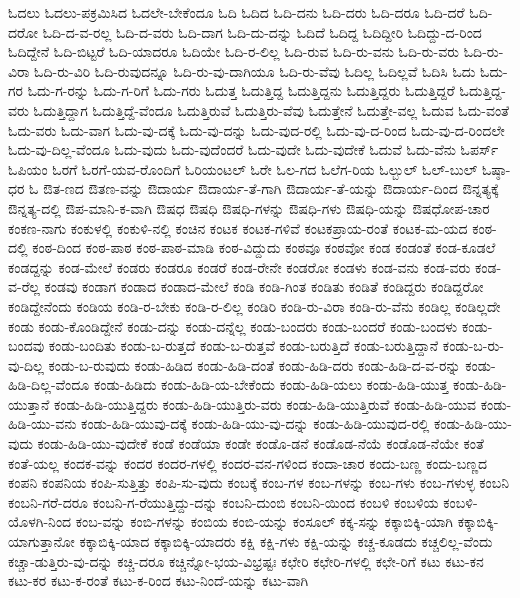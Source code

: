 {ಓದಲು
ಓದಲು-ಪಕ್ರಮಿಸಿದ
ಓದಲೇ-ಬೇಕೆಂದೂ
ಓದಿ
ಓದಿದ
ಓದಿ-ದನು
ಓದಿ-ದರು
ಓದಿ-ದರೂ
ಓದಿ-ದರೆ
ಓದಿ-ದರೋ
ಓದಿ-ದ-ವ-ರಲ್ಲ
ಓದಿ-ದ-ವರು
ಓದಿ-ದಾಗ
ಓದಿ-ದು-ದನ್ನು
ಓದಿದೆ
ಓದಿದ್ದ
ಓದಿದ್ದೀರಿ
ಓದಿದ್ದು-ದ-ರಿಂದ
ಓದಿದ್ದೇನೆ
ಓದಿ-ಬಿಟ್ಟರೆ
ಓದಿ-ಯಾದರೂ
ಓದಿಯೇ
ಓದಿ-ರ-ಲಿಲ್ಲ
ಓದಿ-ರುವ
ಓದಿ-ರು-ವನು
ಓದಿ-ರು-ವರು
ಓದಿ-ರು-ವಿರಾ
ಓದಿ-ರು-ವಿರಿ
ಓದಿ-ರುವುದನ್ನೂ
ಓದಿ-ರು-ವು-ದಾಗಿಯೂ
ಓದಿ-ರು-ವೆವು
ಓದಿಲ್ಲ
ಓದಿಲ್ಲವೆ
ಓದಿಸಿ
ಓದು
ಓದು-ಗರ
ಓದು-ಗ-ರನ್ನು
ಓದು-ಗ-ರಿಗೆ
ಓದು-ಗರು
ಓದುತ್ತ
ಓದುತ್ತಿದ್ದ
ಓದುತ್ತಿದ್ದನು
ಓದುತ್ತಿದ್ದರು
ಓದುತ್ತಿದ್ದರೆ
ಓದುತ್ತಿದ್ದ-ವರು
ಓದುತ್ತಿದ್ದಾಗ
ಓದುತ್ತಿದ್ದೆ-ವೆಂದೂ
ಓದುತ್ತಿರುವೆ
ಓದುತ್ತಿರು-ವೆವು
ಓದುತ್ತೇನೆ
ಓದುತ್ತೇ-ವಲ್ಲ
ಓದುವ
ಓದು-ವಂತೆ
ಓದು-ವರು
ಓದು-ವಾಗ
ಓದು-ವು-ದಕ್ಕೆ
ಓದು-ವು-ದನ್ನು
ಓದು-ವುದ-ರಲ್ಲಿ
ಓದು-ವು-ದ-ರಿಂದ
ಓದು-ವು-ದ-ರಿಂದಲೇ
ಓದು-ವು-ದಿಲ್ಲ-ವೆಂದೂ
ಓದು-ವುದು
ಓದು-ವುದೆಂದರೆ
ಓದು-ವುದೇ
ಓದು-ವುದೇಕೆ
ಓದುವೆ
ಓದು-ವೆನು
ಓಪರ್ಸ್
ಓಪಿಯಂ
ಓರಗೆ
ಓರಗೆ-ಯವ-ರೊಂದಿಗೆ
ಓರಿಯಂಟಲ್
ಓರೇ
ಓಲ-ಗದ
ಓಲೆಗ-ರಿಯ
ಓಲ್ಬುಲ್
ಓಲ್-ಬುಲ್
ಓಷ್ಠಾ-ಧರ
ಓ
ಔತ-ಣದ
ಔತಣ-ವನ್ನು
ಔದಾರ್ಯ
ಔದಾರ್ಯ-ತೆ-ಗಾಗಿ
ಔದಾರ್ಯ-ತೆ-ಯನ್ನು
ಔದಾರ್ಯ-ದಿಂದ
ಔನ್ನತ್ಯಕ್ಕೆ
ಔನ್ನತ್ಯ-ದಲ್ಲಿ
ಔಪ-ಮಾನಿ-ಕ-ವಾಗಿ
ಔಷಧ
ಔಷಧಿ
ಔಷಧಿ-ಗಳನ್ನು
ಔಷಧಿ-ಗಳು
ಔಷಧಿ-ಯನ್ನು
ಔಷಧೋಪ-ಚಾರ
ಕಂಕಣ-ನಾಗು
ಕಂಕುಳಲ್ಲಿ
ಕಂಕುಳಿ-ನಲ್ಲಿ
ಕಂಚಿನ
ಕಂಟಕ
ಕಂಟಕ-ಗಳಿವೆ
ಕಂಟಕಪ್ರಾಯ-ರಂತೆ
ಕಂಟಕ-ಮ-ಯದ
ಕಂಠ-ದಲ್ಲಿ
ಕಂಠ-ದಿಂದ
ಕಂಠ-ಪಾಠ
ಕಂಠ-ಪಾಠ-ಮಾಡಿ
ಕಂಠ-ವಿದ್ದುದು
ಕಂಠವೂ
ಕಂಠವೋ
ಕಂಡ
ಕಂಡಂತೆ
ಕಂಡ-ಕೂಡಲೆ
ಕಂಡದ್ದನ್ನು
ಕಂಡ-ಮೇಲೆ
ಕಂಡರು
ಕಂಡರೂ
ಕಂಡರೆ
ಕಂಡ-ರೇನೇ
ಕಂಡರೋ
ಕಂಡಳು
ಕಂಡ-ವನು
ಕಂಡ-ವರು
ಕಂಡ-ವ-ರೆಲ್ಲ
ಕಂಡವು
ಕಂಡಾಗ
ಕಂಡಾದ
ಕಂಡಾದ-ಮೇಲೆ
ಕಂಡಿ
ಕಂಡಿ-ಗಿಂತ
ಕಂಡಿತು
ಕಂಡಿತೆ
ಕಂಡಿದ್ದರು
ಕಂಡಿದ್ದರೋ
ಕಂಡಿದ್ದೇನೆಂದು
ಕಂಡಿಯ
ಕಂಡಿ-ರ-ಬೇಕು
ಕಂಡಿ-ರ-ಲಿಲ್ಲ
ಕಂಡಿರಿ
ಕಂಡಿ-ರು-ವಿರಾ
ಕಂಡಿ-ರು-ವೆನು
ಕಂಡಿಲ್ಲ
ಕಂಡಿಲ್ಲದೇ
ಕಂಡು
ಕಂಡು-ಕೊಂಡಿದ್ದೇನೆ
ಕಂಡು-ದನ್ನು
ಕಂಡು-ದನ್ನೆಲ್ಲ
ಕಂಡು-ಬಂದರು
ಕಂಡು-ಬಂದರೆ
ಕಂಡು-ಬಂದಳು
ಕಂಡು-ಬಂದವು
ಕಂಡು-ಬಂದಿತು
ಕಂಡು-ಬ-ರುತ್ತದೆ
ಕಂಡು-ಬ-ರುತ್ತವೆ
ಕಂಡು-ಬರುತ್ತಿದೆ
ಕಂಡು-ಬರುತ್ತಿದ್ದಾನೆ
ಕಂಡು-ಬ-ರು-ವು-ದಿಲ್ಲ
ಕಂಡು-ಬ-ರುವುದು
ಕಂಡು-ಹಿಡಿದ
ಕಂಡು-ಹಿಡಿ-ದಂತೆ
ಕಂಡು-ಹಿಡಿ-ದರು
ಕಂಡು-ಹಿಡಿ-ದ-ವ-ರನ್ನು
ಕಂಡು-ಹಿಡಿ-ದಿಲ್ಲ-ವೆಂದೂ
ಕಂಡು-ಹಿಡಿದು
ಕಂಡು-ಹಿಡಿ-ಯ-ಬೇಕೆಂದು
ಕಂಡು-ಹಿಡಿ-ಯಲು
ಕಂಡು-ಹಿಡಿ-ಯುತ್ತ
ಕಂಡು-ಹಿಡಿ-ಯುತ್ತಾನೆ
ಕಂಡು-ಹಿಡಿ-ಯುತ್ತಿದ್ದರು
ಕಂಡು-ಹಿಡಿ-ಯುತ್ತಿರು-ವರು
ಕಂಡು-ಹಿಡಿ-ಯುತ್ತಿರುವೆ
ಕಂಡು-ಹಿಡಿ-ಯುವ
ಕಂಡು-ಹಿಡಿ-ಯು-ವನು
ಕಂಡು-ಹಿಡಿ-ಯುವು-ದಕ್ಕೆ
ಕಂಡು-ಹಿಡಿ-ಯು-ವು-ದನ್ನು
ಕಂಡು-ಹಿಡಿ-ಯುವುದ-ರಲ್ಲಿ
ಕಂಡು-ಹಿಡಿ-ಯು-ವುದು
ಕಂಡು-ಹಿಡಿ-ಯು-ವುದೇಕೆ
ಕಂಡೆ
ಕಂಡೆಯಾ
ಕಂಡೇ
ಕಂಡೊ-ಡನೆ
ಕಂಡೊಡ-ನೆಯೆ
ಕಂಡೊಡ-ನೆಯೇ
ಕಂತೆ
ಕಂತೆ-ಯಲ್ಲ
ಕಂದಕ-ವನ್ನು
ಕಂದರ
ಕಂದರ-ಗಳಲ್ಲಿ
ಕಂದರ-ವನ-ಗಳಿಂದ
ಕಂದಾ-ಚಾರ
ಕಂದು-ಬಣ್ಣ
ಕಂದು-ಬಣ್ಣದ
ಕಂಪನಿ
ಕಂಪನಿಯ
ಕಂಪಿ-ಸುತ್ತಿತ್ತು
ಕಂಪಿ-ಸು-ವುದು
ಕಂಬಕ್ಕೆ
ಕಂಬ-ಗಳ
ಕಂಬ-ಗಳನ್ನು
ಕಂಬ-ಗಳು
ಕಂಬ-ಗಳುಳ್ಳ
ಕಂಬನಿ
ಕಂಬನಿ-ಗರೆ-ದರೂ
ಕಂಬನಿ-ಗ-ರೆಯುತ್ತಿದ್ದು-ದನ್ನು
ಕಂಬನಿ-ದುಂಬಿ
ಕಂಬನಿ-ಯಿಂದ
ಕಂಬಳಿ
ಕಂಬಳಿಯ
ಕಂಬಳಿ-ಯೊಳಗಿ-ನಿಂದ
ಕಂಬ-ವನ್ನು
ಕಂಬಿ-ಗಳನ್ನು
ಕಂಬಿಯ
ಕಂಬಿ-ಯನ್ನು
ಕಂಸೂಲ್
ಕಕ್ಕ-ಸನ್ನು
ಕಕ್ಕಾಬಿಕ್ಕಿ-ಯಾಗಿ
ಕಕ್ಕಾಬಿಕ್ಕಿ-ಯಾಗುತ್ತಾನೋ
ಕಕ್ಕಾಬಿಕ್ಕಿ-ಯಾದ
ಕಕ್ಕಾಬಿಕ್ಕಿ-ಯಾದರು
ಕಕ್ಷಿ
ಕಕ್ಷಿ-ಗಳು
ಕಕ್ಷಿ-ಯನ್ನು
ಕಚ್ಚ-ಕೂಡದು
ಕಚ್ಚಲಿಲ್ಲ-ವೆಂದು
ಕಚ್ಚಾ-ಡುತ್ತಿರು-ವು-ದನ್ನು
ಕಚ್ಚಿ-ದರೂ
ಕಚ್ಚಿನ್ನೋ-ಭಯ-ವಿಭ್ರಷ್ಟಃ
ಕಛೇರಿ
ಕಛೇರಿ-ಗಳಲ್ಲಿ
ಕಛೇ-ರಿಗೆ
ಕಟು
ಕಟು-ಕನ
ಕಟು-ಕರ
ಕಟು-ಕ-ರಂತೆ
ಕಟು-ಕ-ರಿಂದ
ಕಟು-ನಿಂದೆ-ಯನ್ನು
ಕಟು-ವಾಗಿ
}
